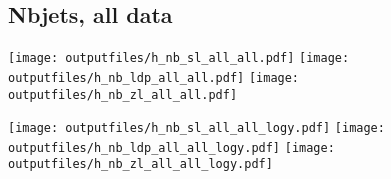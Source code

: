 \documentclass[11pt]{article}
\begin{document}
    \subsection{ Nbjets, all data}

    \noindent
     \texttt{[image: outputfiles/h\_nb\_sl\_all\_all.pdf]}
     \texttt{[image: outputfiles/h\_nb\_ldp\_all\_all.pdf]}
     \texttt{[image: outputfiles/h\_nb\_zl\_all\_all.pdf]}

    \noindent
     \texttt{[image: outputfiles/h\_nb\_sl\_all\_all\_logy.pdf]}
     \texttt{[image: outputfiles/h\_nb\_ldp\_all\_all\_logy.pdf]}
     \texttt{[image: outputfiles/h\_nb\_zl\_all\_all\_logy.pdf]}








\end{document}
